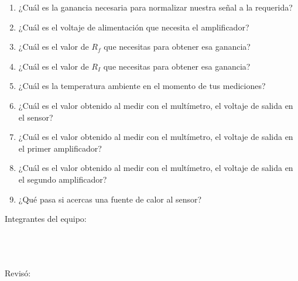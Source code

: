 	\begin{enumerate}
		\item ¿Cuál es la ganancia necesaria para normalizar nuestra señal a la requerida? \newline
		\item ¿Cuál es el voltaje de alimentación que necesita el amplificador? \newline
		\item ¿Cuál es el valor de $R_f$ que necesitas para obtener esa ganancia? \newline
		\item ¿Cuál es el valor de $R_I$ que necesitas para obtener esa ganancia? \newline
		\item ¿Cuál es la temperatura ambiente en el momento de tus mediciones? \newline
		\item ¿Cuál es el valor obtenido al medir con el multímetro, el voltaje de salida en el sensor? \newline
		\item ¿Cuál es el valor obtenido al medir con el multímetro, el voltaje de salida en el primer amplificador? \newline
		\item ¿Cuál es el valor obtenido al medir con el multímetro, el voltaje de salida en el segundo amplificador? \newline
		\item ¿Qué pasa si acercas una fuente de calor al sensor?
	\end{enumerate}

	Integrantes del equipo: \\[0.2cm]
	\horrule{0.5pt} \\[0.2cm] %
	\horrule{0.5pt} \\[0.2cm] %
	\horrule{0.5pt} \\[0.2cm] %
	\horrule{0.5pt} %

	Revisó: \\[0.2cm]
	\horrule{0.5pt} \\%
    

